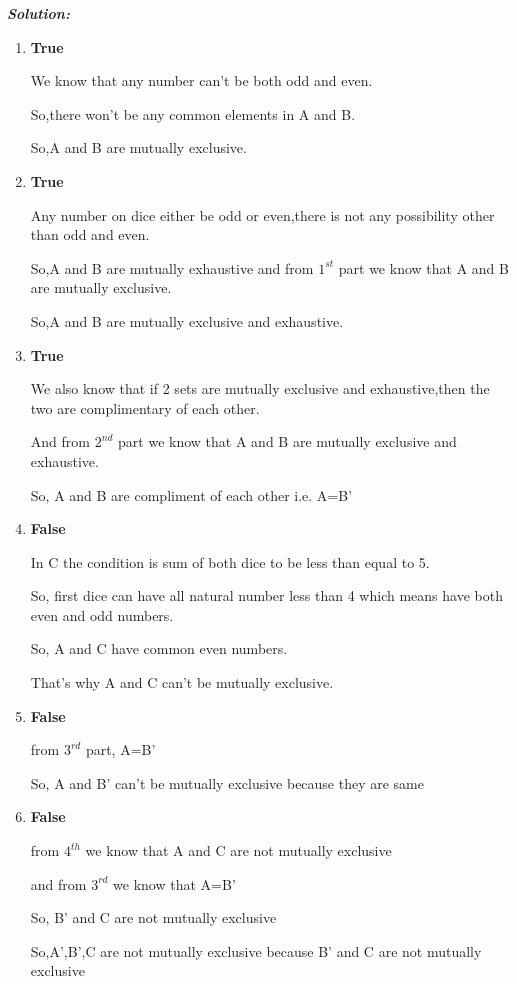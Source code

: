 \documentclass[journal,12pt,twocolumn]{IEEEtran}
\begin{document}
\textbf{\textit{Solution:}}
 \begin{enumerate}
\item \textbf{True}

We know that any number can't be both odd and even.

So,there won't be any common elements in A and B.

So,A and B are mutually exclusive.

\item \textbf{True}

Any number on dice either be odd or even,there is not any possibility other than odd and even.

So,A and B are mutually exhaustive and from $1^{st}$ part we know that A and B are mutually exclusive.

So,A and B are mutually exclusive and exhaustive.

\item \textbf{True}

We also know that if 2 sets are mutually exclusive and exhaustive,then the two are complimentary of each other.

And from $2^{nd}$ part we know that A and B are mutually exclusive and exhaustive.

So, A and B are compliment of each other i.e. A=B'

\item \textbf{False}

In C the condition is sum of both dice to be less than equal to 5.

So, first dice can have all natural number less than 4 which means have both even and odd numbers.

So, A and C have common even numbers.

That's why A and C can't be mutually exclusive.

\item \textbf{False}

from $3^{rd}$ part, A=B' 

So, A and B' can't be mutually exclusive because they are same

\item \textbf{False}

from $4^{th}$ we know that A and C are not mutually exclusive 

and from $3^{rd}$ we know that A=B'

So, B' and C are not mutually exclusive

So,A',B',C are not mutually exclusive because B' and C are not mutually exclusive

\end{enumerate}
\end{document}
